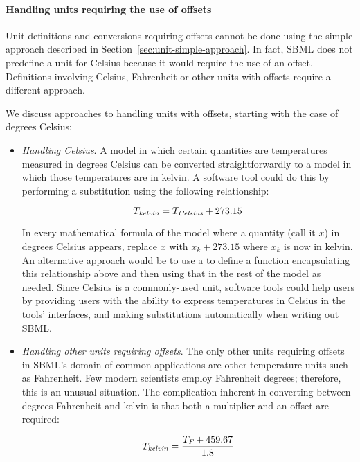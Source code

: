 \paragraph{Handling units requiring the use of offsets}
\label{sec:bp:unitdefinitions:offset}

Unit definitions and conversions requiring offsets cannot be done
using the simple approach described in
Section~\ref{sec:unit-simple-approach}.  In fact, SBML does not
predefine a unit for Celsius because it would require the use of
an offset.  Definitions involving Celsius, Fahrenheit or other
units with offsets require a different approach.

We discuss approaches to handling units with offsets, starting
with the case of degrees Celsius:
\begin{itemize}

\item \emph{Handling Celsius}.  A model in which certain
  quantities are temperatures measured in degrees Celsius can be
  converted straightforwardly to a model in which those
  temperatures are in kelvin.  A software tool could do this by
  performing a substitution using the following relationship:
  \begin{linenomath}
    \begin{equation*}
      T_\emph{kelvin} = T_\emph{Celsius} + 273.15
    \end{equation*}
  \end{linenomath}
  In every mathematical formula of the model where a quantity
  (call it $x$) in degrees Celsius appears, replace $x$ with $x_k
  + 273.15$ where $x_k$ is now in kelvin.  An alternative approach
  would be to use a \FunctionDefinition to define a function
  encapsulating this relationship above and then using that in the
  rest of the model as needed.  Since Celsius is a commonly-used
  unit, software tools could help users by providing users with
  the ability to express temperatures in Celsius in the tools'
  interfaces, and making substitutions automatically when writing
  out SBML.

\item \emph{Handling other units requiring offsets}.  The only
  other units requiring offsets in SBML's domain of common
  applications are other temperature units such as Fahrenheit.
  Few modern scientists employ Fahrenheit degrees; therefore, this
  is an unusual situation.  The complication inherent in
  converting between degrees Fahrenheit and kelvin is that both a
  multiplier and an offset are required:
  \begin{linenomath}
    \begin{equation*}
      T_\emph{kelvin} = \frac{T_\emph{F} + 459.67}{1.8}
      \label{eq:fah-kelvin}
    \end{equation*}
  \end{linenomath}


\end{itemize}
